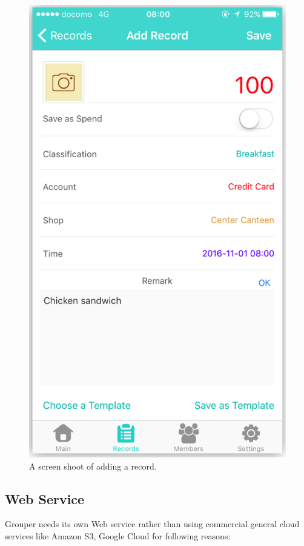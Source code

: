 \documentclass[twocolumn,10pt]{article}
\begin{document}
\begin{figure}[t]
	\centering
	\includegraphics[scale=0.18]{screenshoot}
	\caption{A screen shoot of adding a record.}
\end{figure}

\subsection{Web Service}
Grouper needs its own Web service rather than using commercial general cloud services like Amazon S3, Google Cloud for following reasons:
\end{document}

